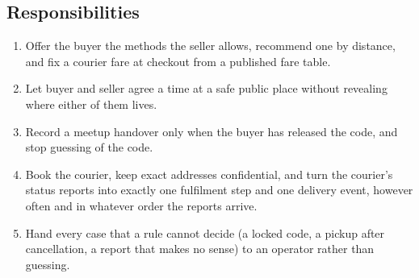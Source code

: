 \documentclass[11pt,a4paper]{article}
\begin{document}
\subsection{Responsibilities}
\begin{enumerate}[nosep]
  \item Offer the buyer the methods the seller allows, recommend one by distance, and fix a courier fare at checkout from a published fare table.
  \item Let buyer and seller agree a time at a safe public place without revealing where either of them lives.
  \item Record a meetup handover only when the buyer has released the code, and stop guessing of the code.
  \item Book the courier, keep exact addresses confidential, and turn the courier's status reports into exactly one fulfilment step and one delivery event, however often and in whatever order the reports arrive.
  \item Hand every case that a rule cannot decide (a locked code, a pickup after cancellation, a report that makes no sense) to an operator rather than guessing.
\end{enumerate}
\end{document}
